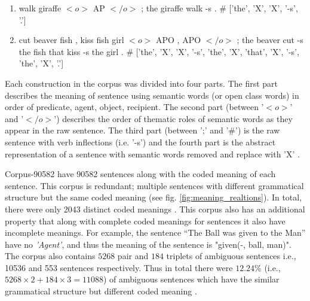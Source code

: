 \begin{enumerate}[noitemsep]
\item walk giraffe $<\!o\!>$ AP $<\!/o\!>$ ; the giraffe walk -s . \# ['the', 'X', 'X', '-s', '.']
\item cut beaver fish , kiss fish girl $<\!o\!>$ APO , APO $<\!/o\!>$ ; the beaver cut -s the fish that kiss -s the girl . \# ['the', 'X', 'X', '-s', 'the', 'X', 'that', 'X', '-s', 'the', 'X', '.']
\end{enumerate}

Each construction in the corpus was divided into four parts. The first part describes the meaning of sentence using semantic words (or open class words) in order of predicate, agent, object, recipient. The second part (between '$<\!o\!>$' and '$<\!/o\!>$') describes the order of thematic roles of semantic words as they appear in the raw sentence. The third part (between ';' and '\#') is the raw sentence with verb inflections (i.e. '-s') and the fourth part is the abstract representation of a sentence with semantic words removed and replace with 'X' \cite{xavier:2013:RT}.

Corpus-90582 have 90582 sentences along with the coded meaning of each sentence. This corpus is redundant; multiple sentences with different grammatical structure but the same coded meaning (see fig. \ref{fig:meaning_realtions}). In total, there were only 2043 distinct coded meanings \cite{xavier:2013:RT}. This corpus also has an additional property that along with complete coded meanings for sentences it also have incomplete meanings. For example, the sentence “The Ball was given to the Man” have no \textit{'Agent'}, and thus the meaning of the sentence is "given(-, ball, man)". The corpus also contains $5268$ pair and $184$ triplets of ambiguous sentences i.e., 10536 and 553 sentences respectively. Thus in total there were $12.24 \%$ (i.e., $ 5268 \times 2 + 184 \times 3 = 11088 $) of ambiguous sentences which have the similar grammatical structure but different coded meaning \cite{xavier:2013:RT}.

